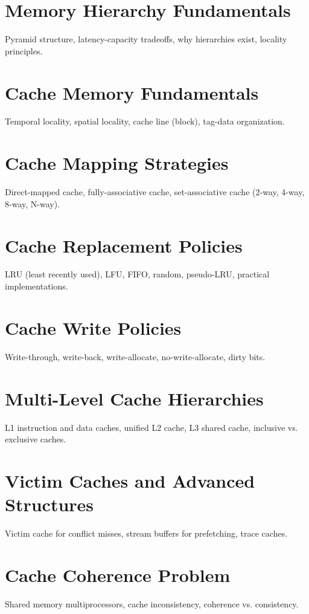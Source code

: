 
\chapter{Memory Hierarchy Fundamentals}
Pyramid structure, latency-capacity tradeoffs, why hierarchies exist, locality principles.

\chapter{Cache Memory Fundamentals}
Temporal locality, spatial locality, cache line (block), tag-data organization.

\chapter{Cache Mapping Strategies}
Direct-mapped cache, fully-associative cache, set-associative cache (2-way, 4-way, 8-way, N-way).

\chapter{Cache Replacement Policies}
LRU (least recently used), LFU, FIFO, random, pseudo-LRU, practical implementations.

\chapter{Cache Write Policies}
Write-through, write-back, write-allocate, no-write-allocate, dirty bits.

\chapter{Multi-Level Cache Hierarchies}
L1 instruction and data caches, unified L2 cache, L3 shared cache, inclusive vs. exclusive caches.

\chapter{Victim Caches and Advanced Structures}
Victim cache for conflict misses, stream buffers for prefetching, trace caches.

\chapter{Cache Coherence Problem}
Shared memory multiprocessors, cache inconsistency, coherence vs. consistency.

